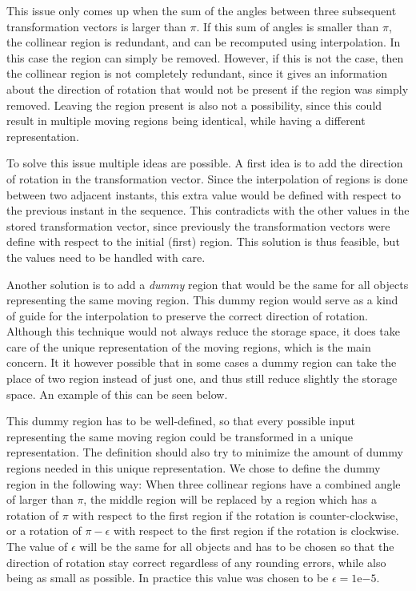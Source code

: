 
This issue only comes up when the sum of the angles between three subsequent transformation vectors is larger than $\pi$. If this sum of angles is smaller than $\pi$, the collinear region is redundant, and can be recomputed using interpolation. In this case the region can simply be removed. However, if this is not the case, then the collinear region is not completely redundant, since it gives an information about the direction of rotation that would not be present if the region was simply removed. Leaving the region present is also not a possibility, since this could result in multiple moving regions being identical, while having a different representation.


To solve this issue multiple ideas are possible. A first idea is to add the direction of rotation in the transformation vector. Since the interpolation of regions is done between two adjacent instants, this extra value would be defined with respect to the previous instant in the sequence. This contradicts with the other values in the stored transformation vector, since previously the transformation vectors were define with respect to the initial (first) region. This solution is thus feasible, but the values need to be handled with care.

Another solution is to add a \textit{dummy} region that would be the same for all objects representing the same moving region. This dummy region would serve as a kind of guide for the interpolation to preserve the correct direction of rotation. Although this technique would not always reduce the storage space, it does take care of the unique representation of the moving regions, which is the main concern. It it however possible that in some cases a dummy region can take the place of two region instead of just one, and thus still reduce slightly the storage space. An example of this can be seen below.


This dummy region has to be well-defined, so that every possible input representing the same moving region could be transformed in a unique representation. The definition should also try to minimize the amount of dummy regions needed in this unique representation. We chose to define the dummy region in the following way: When three collinear regions have a combined angle of larger than $\pi$, the middle region will be replaced by a region which has a rotation of $\pi$ with respect to the first region if the rotation is counter-clockwise, or a rotation of $\pi - \epsilon$ with respect to the first region if the rotation is clockwise. The value of $\epsilon$ will be the same for all objects and has to be chosen so that the direction of rotation stay correct regardless of any rounding errors, while also being as small as possible. In practice this value was chosen to be $\epsilon = 1\mathrm{e}{-5}$.

